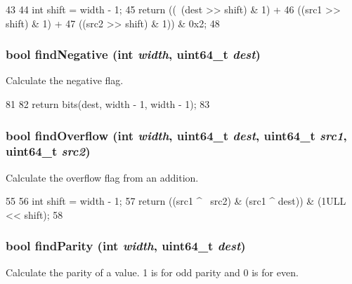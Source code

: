 \begin{DoxyCode}
43                                                                   {
44     int shift = width - 1;
45     return ((~(dest >> shift) & 1) +
46             ((src1 >> shift) & 1) +
47             ((src2 >> shift) & 1)) & 0x2;
48 }
\end{DoxyCode}
\hypertarget{condcodes_8hh_a43e1d3b7ba28675edcf5c15acb397516}{
\subsubsection[{findNegative}]{\setlength{\rightskip}{0pt plus 5cm}bool findNegative (int {\em width}, \/  uint64\_\-t {\em dest})}}
\label{condcodes_8hh_a43e1d3b7ba28675edcf5c15acb397516}
Calculate the negative flag. 


\begin{DoxyCode}
81                                        {
82     return bits(dest, width - 1, width - 1);
83 }
\end{DoxyCode}
\hypertarget{condcodes_8hh_ab8af463ce20b2c4519622e1c79100057}{
\subsubsection[{findOverflow}]{\setlength{\rightskip}{0pt plus 5cm}bool findOverflow (int {\em width}, \/  uint64\_\-t {\em dest}, \/  uint64\_\-t {\em src1}, \/  uint64\_\-t {\em src2})}}
\label{condcodes_8hh_ab8af463ce20b2c4519622e1c79100057}
Calculate the overflow flag from an addition. 


\begin{DoxyCode}
55                                                                      {
56     int shift = width - 1;
57     return ((src1 ^ ~src2) & (src1 ^ dest)) & (1ULL << shift);
58 }
\end{DoxyCode}
\hypertarget{condcodes_8hh_a8b5d8a69b154bcb06d1fef2db3ed24c7}{
\subsubsection[{findParity}]{\setlength{\rightskip}{0pt plus 5cm}bool findParity (int {\em width}, \/  uint64\_\-t {\em dest})}}
\label{condcodes_8hh_a8b5d8a69b154bcb06d1fef2db3ed24c7}
Calculate the parity of a value. 1 is for odd parity and 0 is for even. 



